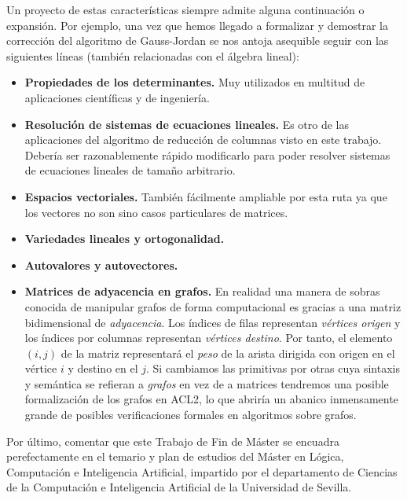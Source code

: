 \documentclass[a4paper,10pt]{article}
\begin{document}
\par \vspace{10pt}

Un proyecto de estas características siempre admite alguna continuación o expansión. Por ejemplo, una vez que hemos llegado a formalizar y demostrar la corrección del algoritmo de Gauss-Jordan se nos antoja asequible seguir con las siguientes líneas (también relacionadas con el álgebra lineal):

\par \vspace{10pt}

\begin{itemize}
	\item \textbf{Propiedades de los determinantes.} Muy utilizados en multitud de aplicaciones científicas y de ingeniería.
	\item \textbf{Resolución de sistemas de ecuaciones lineales.} Es otro de las aplicaciones del algoritmo de reducción de columnas visto en este trabajo. Debería ser razonablemente rápido modificarlo para poder resolver sistemas de ecuaciones lineales de tamaño arbitrario.
	\item \textbf{Espacios vectoriales.} También fácilmente ampliable por esta ruta ya que los vectores no son sino casos particulares de matrices.
	\item \textbf{Variedades lineales y ortogonalidad.} 
	\item \textbf{Autovalores y autovectores.}
	\item \textbf{Matrices de adyacencia en grafos.} En realidad una manera de sobras conocida de manipular grafos de forma computacional es gracias a una matriz bidimensional de \emph{adyacencia}. Los índices de filas representan \emph{vértices origen} y los índices por columnas representan \emph{vértices destino}. Por tanto, el elemento $(i,j)$ de la matriz representará el \emph{peso} de la arista dirigida con origen en el vértice $i$ y destino en el $j$. Si cambiamos las primitivas por otras cuya sintaxis y semántica se refieran a \emph{grafos} en vez de a matrices tendremos una posible formalización de los grafos en ACL2, lo que abriría un abanico inmensamente grande de posibles verificaciones formales en algoritmos sobre grafos.
\end{itemize}

\par \vspace{10pt}

Por último, comentar que este Trabajo de Fin de Máster se encuadra perefectamente en el temario y plan de estudios del Máster en Lógica, Computación e Inteligencia Artificial, impartido por el departamento de Ciencias de la Computación e Inteligencia Artificial de la Universidad de Sevilla. 
\end{document}
